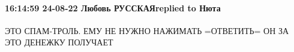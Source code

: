  
 
 
 
 

\paragraph{16:14:59 24-08-22 Любовь РУССКАЯreplied to Нюта}

ЭТО СПАМ-ТРОЛЬ. ЕМУ НЕ НУЖНО НАЖИМАТЬ =ОТВЕТИТЬ= ОН ЗА ЭТО ДЕНЕЖКУ ПОЛУЧАЕТ


